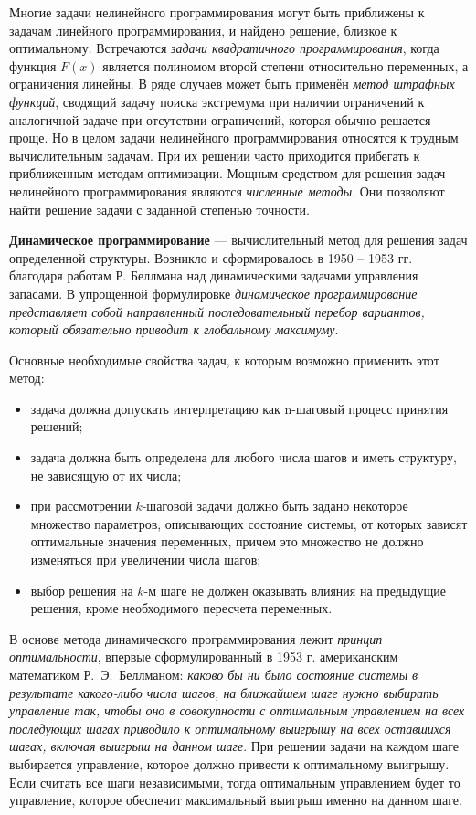 Многие задачи нелинейного программирования могут быть приближены к задачам линейного программирования, и найдено решение, близкое к оптимальному. Встречаются \textsl{задачи квадратичного программирования}, когда
функция $ F(x) $ является полиномом второй степени относительно переменных, а ограничения линейны. В ряде случаев может быть применён 
\textsl{метод штрафных функций}, сводящий задачу поиска экстремума при наличии ограничений к аналогичной задаче при отсутствии ограничений, которая обычно решается проще. Но в целом задачи нелинейного программирования относятся к трудным вычислительным задачам. При их решении часто приходится прибегать к приближенным методам оптимизации. Мощным средством для решения задач нелинейного программирования являются 
\textsl{численные методы}. Они позволяют найти решение задачи с заданной степенью точности. 

\textbf{Динамическое программирование} --- вычислительный метод для решения задач определенной структуры. Возникло и сформировалось в 1950 -- 1953 гг. благодаря работам Р. Беллмана над динамическими задачами управления запасами. В упрощенной формулировке \textsl{динамическое программирование представляет собой направленный последовательный перебор вариантов, который обязательно приводит к глобальному максимуму}. 

Основные необходимые свойства задач, к которым возможно
применить этот метод:

\begin{itemize}

\item задача должна допускать интерпретацию как
  n-шаговый процесс принятия решений;

\item задача должна быть определена для
  любого числа шагов и иметь структуру, не зависящую от их числа;

\item при рассмотрении $k$-шаговой задачи должно быть задано некоторое множество
  параметров, описывающих состояние системы, от которых зависят
  оптимальные значения переменных, причем это множество не должно
  изменяться при увеличении числа шагов;

\item выбор решения на $k$-м шаге не должен оказывать влияния на предыдущие решения, кроме
  необходимого пересчета переменных. 

\end{itemize}

В основе метода динамического программирования лежит \textsl{принцип оптимальности},
впервые сформулированный в 1953 г. американским
математиком Р.~Э.~Беллманом: \textsl{каково бы ни было состояние системы в
результате какого-либо числа шагов, на ближайшем шаге нужно выбирать
управление так, чтобы оно в совокупности с оптимальным управлением на
всех последующих шагах приводило к оптимальному выигрышу на всех
оставшихся шагах, включая выигрыш на данном шаге}. При решении задачи
на каждом шаге выбирается управление, которое должно привести к
оптимальному выигрышу. Если считать все шаги независимыми, тогда
оптимальным управлением будет то управление, которое обеспечит
максимальный выигрыш именно на данном шаге.

